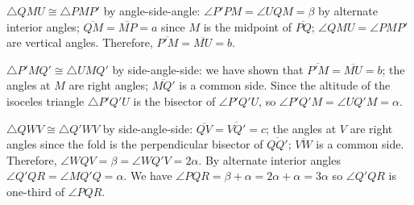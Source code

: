 $\triangle QMU\cong \triangle PMP'$ by angle-side-angle:  $\angle P'PM=\angle UQM=\beta$ by alternate interior angles; $\overline{QM}=\overline{MP}=a$ since $M$ is the midpoint of $\overline{PQ}$; $\angle QMU=\angle PMP'$ are vertical angles. Therefore, $\overline{P'M}=\overline{MU}=b$.

$\triangle P'MQ'\cong \triangle UMQ'$ by side-angle-side: we have shown that $\overline{P'M}=\overline{MU}=b$; the angles at $M$ are right angles; $\overline{MQ'}$ is a common side. Since the altitude of the isoceles triangle $\triangle P'Q'U$ is the bisector of $\angle P'Q'U$, so $\angle P'Q'M=\angle UQ'M=\alpha$.

$\triangle QWV\cong\triangle Q'WV$ by side-angle-side: $\overline{QV}=\overline{VQ'}=c$; the angles at $V$ are right angles since the fold is the perpendicular bisector of $\overline{QQ'}$; $\overline{VW}$ is a common side. Therefore, $\angle WQV=\beta=\angle WQ'V=2\alpha$. By alternate interior angles $\angle Q'QR=\angle MQ'Q=\alpha$. We have $\angle PQR = \beta + \alpha = 2\alpha+\alpha=3\alpha$ so $\angle Q'QR$ is one-third of $\angle PQR$.
